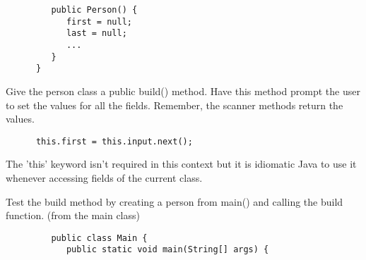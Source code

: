 \documentclass{article}
\begin{document}
\begin{steps}
\begin{verbatim}
         public Person() {
            first = null;
            last = null;
            ...
         }
      }
      \end{verbatim}

      \item Give the person class a public build() method. Have this method prompt the user
         to set the values for all the fields. Remember, the scanner methods return the values.
      \begin{verbatim}
      this.first = this.input.next();
      \end{verbatim}
         The 'this' keyword isn't required in this context but it is idiomatic Java to use it
         whenever accessing fields of the current class.
      \item Test the build method by creating a person from main() and calling the build
         function. (from the main class)
      \begin{verbatim}
         public class Main {
            public static void main(String[] args) {
      \end{verbatim}
      \vspace{.5cm}
      \underline{\hspace{15cm}}\\
      \vspace{.5cm}\\
      \underline{\hspace{15cm}}


\end{steps}
\end{document}
